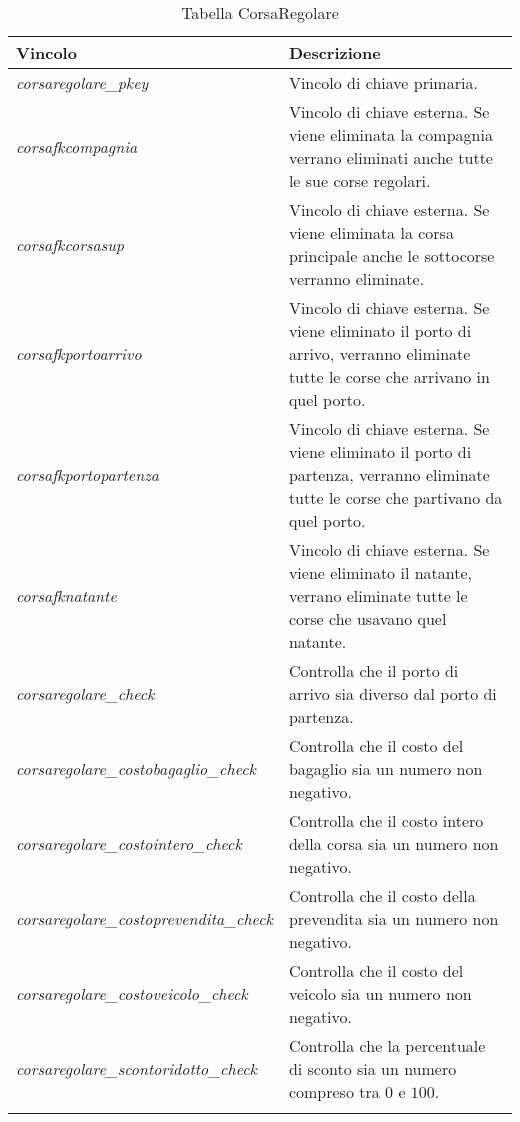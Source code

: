 \begin{longtable}{|| m{} | m{} ||}
    \hline\hline
     \textbf{Vincolo} & \textbf{Descrizione} \\ [1ex]
     \hline\hline
     \endfirsthead

      \textit{corsaregolare\_pkey} & Vincolo di chiave primaria. \\ [1ex]
        \hline

      \textit{corsafkcompagnia} & Vincolo di chiave esterna. Se viene eliminata la compagnia verrano eliminati anche tutte le sue corse regolari. \\ [1ex]
     \hline

     \textit{corsafkcorsasup} & Vincolo di chiave esterna. Se viene eliminata la corsa principale anche le sottocorse verranno eliminate. \\ [1ex]
     \hline

     \textit{corsafkportoarrivo} & Vincolo di chiave esterna. Se viene eliminato il porto di arrivo, verranno eliminate tutte le corse che arrivano in quel porto. \\ [1ex]
     \hline

     \textit{corsafkportopartenza} & Vincolo di chiave esterna. Se viene eliminato il porto di partenza, verranno eliminate tutte le corse che partivano da quel porto. \\ [1ex]
     \hline

    \textit{corsafknatante} & Vincolo di chiave esterna. Se viene eliminato il natante, verrano eliminate tutte le corse che usavano quel natante. \\ [1ex]
     \hline

     \textit{corsaregolare\_check} & Controlla che il porto di arrivo sia diverso dal porto di partenza. \\ [1ex]
     \hline

     \textit{corsaregolare\_costobagaglio\_check} & Controlla che il costo del bagaglio sia un numero non negativo. \\ [1ex]
     \hline

     \textit{corsaregolare\_costointero\_check} & Controlla che il costo intero della corsa sia un numero non negativo. \\ [1ex]
     \hline

     \textit{corsaregolare\_costoprevendita\_check} & Controlla che il costo della prevendita sia un numero non negativo. \\ [1ex]
     \hline

     \textit{corsaregolare\_costoveicolo\_check} & Controlla che il costo del veicolo sia un numero non negativo. \\ [1ex]
     \hline

     \textit{corsaregolare\_scontoridotto\_check} & Controlla che la percentuale di sconto sia un numero compreso tra $0$ e $100$. \\ [1ex]      
     \hline\hline

     \caption*{Tabella CorsaRegolare} \\
\end{longtable}

